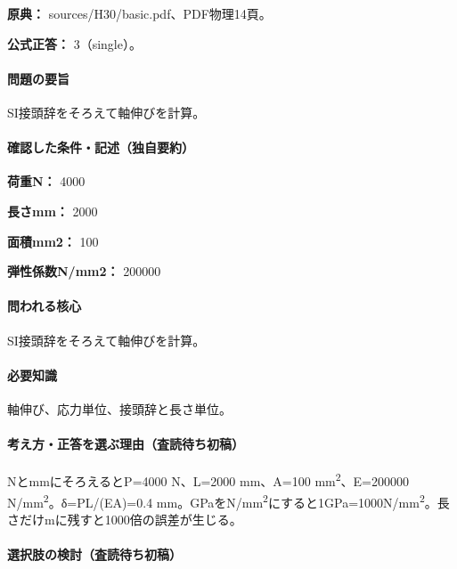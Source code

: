 \noindent\textbf{原典：} sources/H30/basic.pdf、PDF物理14頁。

\textbf{公式正答：} 3（single）。

\paragraph{問題の要旨} SI接頭辞をそろえて軸伸びを計算。

\paragraph{確認した条件・記述（独自要約）}\mbox{}\par

\noindent\textbf{荷重N：} 4000\par

\noindent\textbf{長さmm：} 2000\par

\noindent\textbf{面積mm2：} 100\par

\noindent\textbf{弾性係数N/mm2：} 200000\par

\paragraph{問われる核心} SI接頭辞をそろえて軸伸びを計算。

\paragraph{必要知識} 軸伸び、応力単位、接頭辞と長さ単位。

\paragraph{考え方・正答を選ぶ理由（査読待ち初稿）} NとmmにそろえるとP=\allowbreak{}4000 N、L=\allowbreak{}2000 mm、A=\allowbreak{}100 mm\textsuperscript{2}、E=\allowbreak{}200000 N/mm\textsuperscript{2}。δ=PL/(EA)=\allowbreak{}0.4 mm。GPaをN/mm\textsuperscript{2}にすると1GPa=\allowbreak{}1000N/mm\textsuperscript{2}。長さだけmに残すと1000倍の誤差が生じる。

\paragraph{選択肢の検討（査読待ち初稿）}\mbox{}\par

